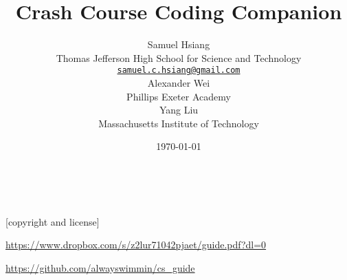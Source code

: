\title{Crash Course Coding Companion}
\author{
Samuel Hsiang \\ 
Thomas Jefferson High School for Science and Technology \\ 
\href{mailto:samuel.c.hsiang@gmail.com}{\texttt{\textup{samuel.c.hsiang@gmail.com}}} \\
\vspace{.7em}
Alexander Wei \\
Phillips Exeter Academy \\
\vspace{.7em}
Yang Liu \\
Massachusetts Institute of Technology
}
\date{\today}

\maketitle

\newpage
~\vfill
\thispagestyle{empty}

[copyright and license]






\noindent \url{https://www.dropbox.com/s/z2lur71042pjaet/guide.pdf?dl=0}

\noindent \url{https://github.com/alwayswimmin/cs_guide}



\newpage
\thispagestyle{empty}
